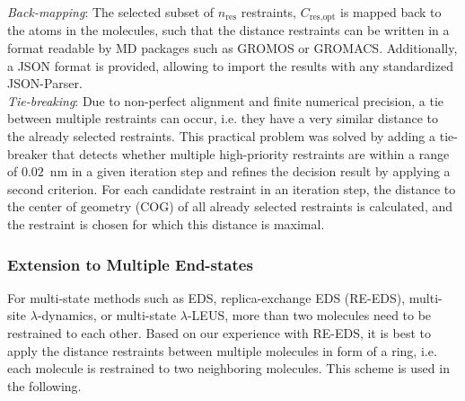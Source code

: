 \noindent \textit{Back-mapping}:
The selected subset of $n_\text{res}$ restraints, $C_\text{res,opt}$ is mapped back to the atoms in the molecules, such that the distance restraints can be written in a format readable by MD packages such as GROMOS\cite{Schmid2012} or GROMACS.\cite{Abraham2015} Additionally, a JSON\cite{Pezoa2016} format is provided, allowing to import the results with any standardized JSON-Parser. \\

\noindent \textit{Tie-breaking}:
Due to non-perfect alignment and finite numerical precision, a tie between multiple restraints can occur, i.e. they have a very similar distance to the already selected restraints. This practical problem was solved by adding a tie-breaker that detects whether multiple high-priority restraints are within a range of $0.02$~nm in a given iteration step and refines the decision result by applying a second criterion. 
For each candidate restraint in an iteration step, the distance to the center of geometry (COG) of all already selected restraints is calculated, and the restraint is chosen for which this distance is maximal.


\subsubsection{Extension to Multiple End-states}

For multi-state methods such as EDS\cite{Christ2007,Christ2008}, replica-exchange EDS (RE-EDS)\cite{Sidler2016,Sidler2017,Ries2021B}, multi-site $\lambda$-dynamics,\cite{Knight2011} or multi-state $\lambda$-LEUS,\cite{Bieler2015} more than two molecules need to be restrained to each other. Based on our experience with RE-EDS, it is best to apply the distance restraints between multiple molecules in form of a ring, i.e. each molecule is restrained to two neighboring molecules.\cite{Ries2021B} This scheme is used in the following.

